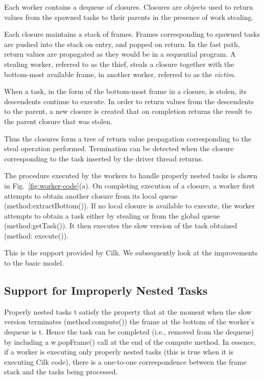 Each worker contains a dequeue of closures. Closures are objects used
to return values from the spawned tasks to their parents in the
presence of work stealing.  

Each closure maintains a stack of frames. Frames corresponding to
spawned tasks are pushed into the stack on entry, and popped on
return. In the fast path, return values are propagated as they would
be in a sequential program. A stealing worker, referred to as the
{\java thief}, steals a closure together with the bottom-most available
frame, in another worker, referred to as the {\em victim}.

When a task, in the form of the bottom-most frame in a closure, is
stolen, its descendents continue to execute. In order to return values
from the descendents to the parent, a new closure is created that on
completion returns the result to the parent closure that was stolen. 

Thus the closures form a tree of return value propagation
corresponding to the steal operation performed. Termination can be
detected when the closure corresponding to the task inserted by the
driver thread returns. 

The procedure executed by the workers to handle properly nested tasks
is shown in Fig.~\ref{fig:worker-code}(a). On completing execution of
a closure, a worker first attempts to obtain another closure from its
local queue (method:{\java extractBottom()}). If no local closure is
available to execute, the worker attempts to obtain a task either by
stealing or from the global queue (method:{\java getTask()}). It then
executes the slow version of the task obtained (method:{\java
  execute()}). 

This is the support provided by Cilk. We subsequently look at the
improvements to the basic model.


\subsection{Support for Improperly Nested Tasks}

Properly nested tasks t satisfy the property that at the moment when
the slow version terminates (method:{\java compute()}) the frame at
the bottom of the worker's dequeue is t. Hence the task can be
completed (i.e., removed from the dequeue) by including a {\java
w.popFrame()} call at the end of the compute method. In essence, if a
worker is executing only properly nested tasks (this is true when it
is executing Cilk code), there is a one-to-one correspondence between
the frame stack and the tasks being processed.


